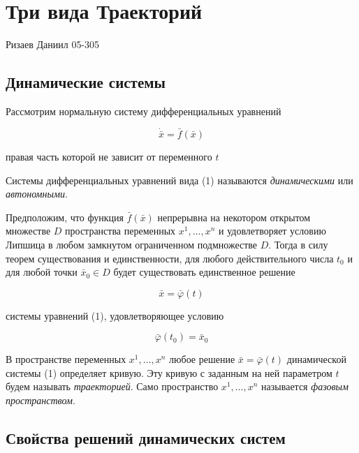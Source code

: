 \documentclass{article}
\theoremstyle{definition} \newtheorem*{theorem*}{Теорема}
\theoremstyle{plain} \newtheorem{theorem}{Теорема}[section]
\theoremstyle{definition} \newtheorem*{corollary*}{Следствие}
\theoremstyle{definition} \newtheorem{corollary}{Следствие}[section]
\begin{document}
\abovedisplayskip=0pt
\belowdisplayskip=9pt
\abovedisplayshortskip=0pt
\belowdisplayshortskip=12pt

\section*{Три вида Траекторий}
Ризаев Даниил 05-305

\subsection*{Динамические системы}

Рассмотрим нормальную систему дифференциальных уравнений

\begin{equation}
    \dot{\bar{x}} = \bar{f}(\bar{x})
\end{equation}

правая часть которой не зависит от переменного $t$

Системы дифференциальных уравнений вида (1) называются
\textit{динамическими} или \textit{автономными}.

Предположим, что функция $\bar{f}(\bar{x})$ непрерывна на
некотором открытом множестве $D$ пространства переменных
$x^1, \dots, x^n$ и удовлетворяет условию Липшица в любом
замкнутом ограниченном подмножестве $D$. Тогда
в силу теорем существования и единственности, для любого
действительного числа $t_0$ и для любой точки $\bar{x}_0 \in D$
будет существовать единственное решение

\begin{equation*}
    \bar{x} = \bar{\varphi}(t)
\end{equation*}

системы уравнений (1), удовлетворяющее условию

\begin{equation*}
    \bar{\varphi}(t_0) = \bar{x}_0
\end{equation*}

В пространстве переменных $x^1, \dots, x^n$ любое
решение $\bar{x} = \bar{\varphi}(t)$ динамической системы (1)
определяет кривую. Эту кривую с заданным на ней параметром
$t$ будем называть \textit{траекторией}.
Само пространство $x^1, \dots, x^n$ называется
\textit{фазовым пространством}.

\subsection*{Свойства решений динамических систем}
\end{document}
